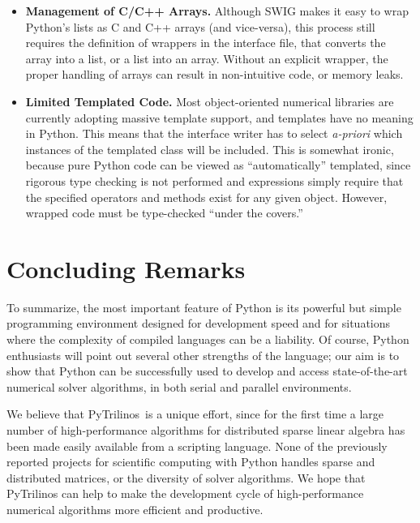 \documentclass[acmtocl]{acmtrans2m}
\newcommand{\PyTrilinos}{{PyTrilinos}}
\begin{document}
\begin{itemize}
  {\bf Last sentence is difficult to read and very technical. Should we skip
    it?}

\item {\bf Management of C/C++ Arrays.} Although SWIG makes it easy to
  wrap Python's lists as C and C++ arrays (and vice-versa), this
  process still requires the definition of wrappers in the interface
  file, that converts the array into a list, or a list into an
  array. Without an explicit wrapper, the proper handling of arrays
  can result in non-intuitive code, or memory leaks.

\item {\bf Limited Templated Code.} Most object-oriented numerical
  libraries are currently adopting massive template support, and
  templates have no meaning in Python.  This means that the interface
  writer has to select {\sl a-priori} which instances of the templated
  class will be included.  This is somewhat ironic, because pure
  Python code can be viewed as ``automatically'' templated, since
  rigorous type checking is not performed and expressions simply
  require that the specified operators and methods exist for any given
  object.  However, wrapped code must be type-checked ``under the
  covers.''

\end{itemize}

\section{Concluding Remarks}
\label{sec:concluding}

To summarize, the most important feature of Python is its powerful but
simple programming environment designed for development speed and for
situations where the complexity of compiled languages can be a
liability. Of course, Python enthusiasts will point out several other
strengths of the language; our aim is to show that Python can be
successfully used to develop and access state-of-the-art numerical
solver algorithms, in both serial and parallel environments.

We believe that \PyTrilinos\ is a unique effort, since for the first
time a large number of high-performance algorithms for distributed
sparse linear algebra has been made easily available from a scripting
language.  None of the previously reported projects for scientific
computing with Python handles sparse and distributed matrices, or the
diversity of solver algorithms. We hope that PyTrilinos can help to
make the development cycle of high-performance numerical algorithms
more efficient and productive.
\end{document}
